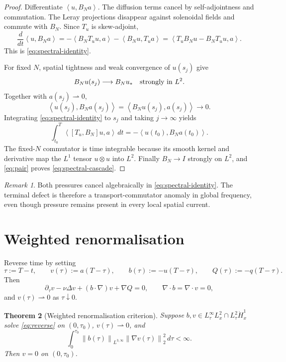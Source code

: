 \documentclass[11pt]{article}
\newtheorem{theorem}{Theorem}
\theoremstyle{remark}
\newtheorem{remark}[theorem]{Remark}
\newcommand{\ip}[2]{\left\langle #1,#2\right\rangle}
\newcommand{\norm}[1]{\left\|#1\right\|}
\newcommand{\weakto}{\rightharpoonup}
\begin{document}
\begin{proof}
Differentiate \(\ip{u}{B_Na}\).  The diffusion terms cancel by
self-adjointness and commutation.  The Leray projections disappear
against solenoidal fields and commute with \(B_N\).  Since \(T_u\) is
skew-adjoint,
\[
 \frac d{dt}\ip{u}{B_Na}
 =
 -\ip{B_NT_uu}{a}-\ip{B_Nu}{T_ua}
 =
 \ip{T_uB_Nu-B_NT_uu}{a}.
\]
This is \eqref{eq:spectral-identity}.

For fixed \(N\), spatial tightness and weak convergence of \(u(s_j)\)
give
\[
 B_Nu(s_j)\longrightarrow B_Nu_*
 \quad\hbox{strongly in }L^2.
\]
Together with \(a(s_j)\weakto0\),
\[
 \ip{u(s_j)}{B_Na(s_j)}
 =
 \ip{B_Nu(s_j)}{a(s_j)}
 \longrightarrow0.
\]
Integrating \eqref{eq:spectral-identity} to \(s_j\) and taking
\(j\to\infty\) yields
\[
 \int_{t_0}^{T}\ip{[T_u,B_N]u}{a}\,dt
 =
 -\ip{u(t_0)}{B_Na(t_0)}.
\]
The fixed-\(N\) commutator is time integrable because its smooth kernel
and derivative map the \(L^1\) tensor \(u\otimes u\) into \(L^2\).
Finally \(B_N\to I\) strongly on \(L^2\), and
\eqref{eq:pair} proves \eqref{eq:spectral-cascade}.
\end{proof}

\begin{remark}
Both pressures cancel algebraically in
\eqref{eq:spectral-identity}.  The terminal defect is therefore a
transport-commutator anomaly in global frequency, even though pressure
remains present in every local spatial current.
\end{remark}

\section{Weighted renormalisation}

Reverse time by setting
\[
 \tau:=T-t,\qquad
 v(\tau):=a(T-\tau),\qquad
 b(\tau):=-u(T-\tau),\qquad
 Q(\tau):=-q(T-\tau).
\]
Then
\begin{equation}
 \label{eq:reverse}
 \partial_\tau v-\nu\Delta v
 +(b\cdot\nabla)v+\nabla Q=0,
 \qquad
 \nabla\cdot b=\nabla\cdot v=0,
\end{equation}
and \(v(\tau)\weakto0\) as \(\tau\downarrow0\).

\begin{theorem}[Weighted renormalisation criterion]
\label{thm:renormalisation}
Suppose \(b,v\in L^\infty_\tau L^2_x\cap
L^2_\tau\dot H^1_x\) solve \eqref{eq:reverse} on
\((0,\tau_0)\), \(v(\tau)\weakto0\), and
\begin{equation}
 \label{eq:weighted-finite}
 \int_0^{\tau_0}
 \norm{b(\tau)}_{L^{3,\infty}}
 \norm{\nabla v(\tau)}_2^2\,d\tau<\infty.
\end{equation}
Then \(v=0\) on \((0,\tau_0)\).
\end{theorem}
\end{document}
